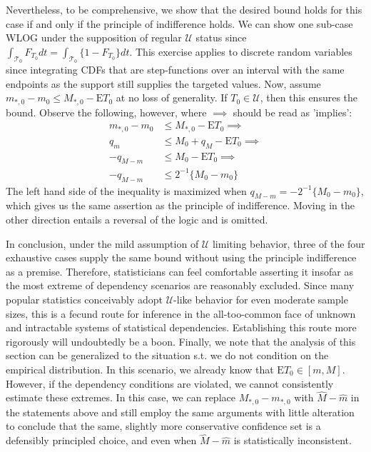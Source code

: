 \documentclass[12pt]{amsart}
\theoremstyle{plain}%
\theoremstyle{definition}
\theoremstyle{remark}
\numberwithin{equation}{section}
\begin{document}
Nevertheless, to be comprehensive, we show that the desired bound holds for this case if and only if the principle of indifference holds. We can show one sub-case WLOG under the supposition of regular $\mathcal{U}$ status since $\int_{\mathcal{T_0}} F_{T_0} dt = \int_{\mathcal{T_0}} \{1- F_{T_0} \} dt $. This exercise applies to discrete random variables since integrating CDFs that are step-functions over an interval with the same endpoints as the support still supplies the targeted values. Now, assume $m_{*, 0}-m_0 \leq M_{*, 0} - \text{E}T_0$ at no loss of generality. If $T_0 \in \mathcal{U}$, then this ensures the bound. Observe the following, however, where $\implies$ should be read as 'implies':
\begin{align*}
m_{*, 0}-m_0 & \leq M_{*, 0} - \text{E}T_0 \implies \\
q_m & \leq M_0 + q_M -  \text{E}T_0 \implies \\
-q_{M-m} & \leq M_0 -  \text{E}T_0 \implies \\
-q_{M-m} & \leq 2^{-1} \{M_0 - m_0 \}
\end{align*}
The left hand side of the inequality is maximized when $q_{M-m} = -2^{-1}\{M_0 - m_0 \}$, which gives us the same assertion as the principle of indifference. Moving in the other direction entails a reversal of the logic and is omitted.

In conclusion, under the mild assumption of $\mathcal{U}$ limiting behavior, three of the four exhaustive cases supply the same bound without using the principle indifference as a premise. Therefore, statisticians can feel comfortable asserting it insofar as the most extreme of dependency scenarios are reasonably excluded. Since many popular statistics conceivably adopt $\mathcal{U}$-like behavior for even moderate sample sizes, this is a fecund route for inference in the all-too-common face of unknown and intractable systems of statistical dependencies. Establishing this route more rigorously will undoubtedly be a boon. Finally, we note that the analysis of this section can be generalized to the situation s.t. we do not condition on the empirical distribution. In this scenario, we already know that $\text{E}T_0 \in [m, M]$. However, if the dependency conditions are violated, we cannot consistently estimate these extremes. In this case, we can replace $M_{*, 0} - m_{*, 0}$ with $\hat{M} - \hat{m}$ in the statements above and still employ the same arguments with little alteration to conclude that the same, slightly more conservative confidence set is a defensibly principled choice, and even when $\hat{M} - \hat{m}$ is statistically inconsistent.
\end{document}
